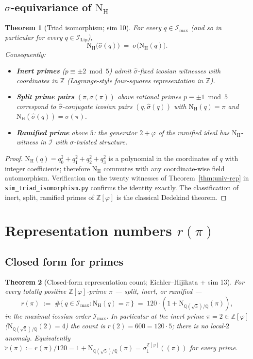\documentclass[11pt,a4paper]{article}
\newtheorem{theorem}{Theorem}
\theoremstyle{definition}
\theoremstyle{remark}
\newcommand{\Z}{\mathbb{Z}}
\newcommand{\II}{\mathcal{I}}
\newcommand{\IIlip}{\mathcal{I}_{\mathrm{Lip}}}
\newcommand{\IImax}{\mathcal{I}_{\mathrm{max}}}
\newcommand{\NH}{\mathrm{N}_{\mathrm{H}}}
\newcommand{\NQ}{\mathrm{N}_{\mathbb{Q}(\sqrt{5})/\mathbb{Q}}}
\newcommand{\Zphi}{\Z[\varphi]}
\begin{document}
\subsection{$\sigma$-equivariance of $\NH$}

\begin{theorem}[Triad isomorphism; sim 10]\label{thm:triad-iso}
For every $q \in \IImax$ (and so in particular for every $q \in \IIlip$),
\[
  \NH\bigl(\widehat\sigma(q)\bigr) \;=\; \sigma\bigl(\NH(q)\bigr).
\]
Consequently:
\begin{itemize}
  \item \textbf{Inert primes} ($p \equiv \pm 2 \bmod 5$) admit
    $\widehat\sigma$-fixed icosian witnesses with coordinates in $\Z$
    (Lagrange-style four-squares representation in $\Z$).
  \item \textbf{Split prime pairs} $(\pi, \sigma(\pi))$ above rational
    primes $p \equiv \pm 1 \bmod 5$ correspond to $\widehat\sigma$-conjugate
    icosian pairs $(q, \widehat\sigma(q))$ with $\NH(q) = \pi$ and
    $\NH(\widehat\sigma(q)) = \sigma(\pi)$.
  \item \textbf{Ramified prime} above $5$: the generator $2 + \varphi$ of
    the ramified ideal has $\NH$-witness in $\II$ with $\sigma$-twisted
    structure.
\end{itemize}
\end{theorem}

\begin{proof}
$\NH(q) = q_0^2 + q_1^2 + q_2^2 + q_3^2$ is a polynomial in the coordinates
of $q$ with integer coefficients; therefore $\NH$ commutes with any
coordinate-wise field automorphism. Verification on the twenty witnesses of
Theorem~\ref{thm:univ-rep} in \texttt{sim\_triad\_isomorphism.py} confirms
the identity exactly. The classification of inert, split, ramified primes
of $\Zphi$ is the classical Dedekind theorem.
\end{proof}

\bigskip

\section{Representation numbers $r(\pi)$}\label{sec:reps}

\subsection{Closed form for primes}

\begin{theorem}[Closed-form representation count; Eichler--Hijikata + sim 13]\label{thm:rpi}
For \emph{every} totally positive $\Zphi$-prime $\pi$ --- split, inert, or
ramified ---
\[
  r(\pi) \;:=\; \#\{\,q \in \IImax : \NH(q) = \pi\,\}
  \;=\; 120\!\cdot\!(1 + \NQ(\pi)),
\]
in the maximal icosian order $\IImax$. In particular at the inert prime
$\pi = 2 \in \Zphi$ ($\NQ(2)=4$) the count is $r(2) = 600 = 120\cdot 5$; there
is \emph{no} local-$2$ anomaly. Equivalently $\widetilde r(\pi) := r(\pi)/120
= 1 + \NQ(\pi) = \sigma_1^{\Zphi}((\pi))$ for every prime.
\end{theorem}
\end{document}
